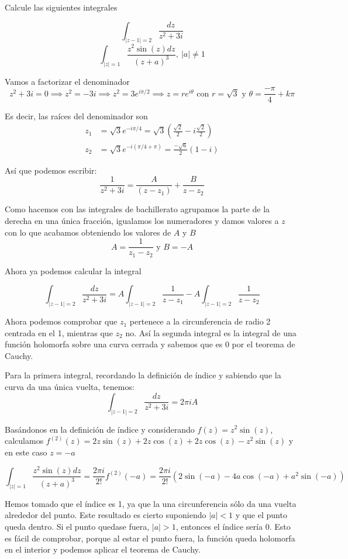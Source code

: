 \begin{problem}[10]
Calcule las siguientes integrales

\ppart
\[\int_{|z-1|=2}\frac{dz}{z^2+3i}\]
\ppart
\[\int_{|z|=1}\frac{z^2\sin(z)dz}{(z+a)^3}, \ |a|\neq 1\]
\solution

\spart

Vamos a factorizar el denominador
\[z^2+3i= 0 \implies z^2=-3i \implies z^2=3e^{iπ/2} \implies z=re^{i\theta} \text{ con } r=\sqrt{3} \text{ y } \theta = \frac{-π}{4}+kπ\]

Es decir, las raíces del denominador son
\begin{align}
z_1 &=\sqrt{3}e^{-iπ/4} = \sqrt{3}\left( \frac{\sqrt{2}}{2}-i\frac{\sqrt{2}}{2}\right)\\
z_2 &=\sqrt{3}e^{-i(π/4+π)} = \frac{-\sqrt{6}}{2}(1-i)
\end{align}

Así que podemos escribir:
\[\frac{1}{z^2+3i} = \frac{A}{(z-z_1)}+\frac{B}{z-z_2}\]

Como hacemos con las integrales de bachillerato agrupamos la parte de la derecha en una única fracción, igualamos los numeradores y damos valores  a $z$ con lo que acabamos obteniendo los valores de $A$ y $B$
\[A= \frac{1}{z_1-z_2} \text{ y } B=-A\]

Ahora ya podemos calcular la integral

\[\int_{|z-1|=2}\frac{dz}{z^2+3i} = A\int_{|z-1|=2}\frac{1}{z-z_1}-A\int_{|z-1|=2}\frac{1}{z-z_2}\]

Ahora podemos comprobar que $z_1$ pertenece a la circunferencia de radio 2 centrada en el 1, mientras que $z_2$ no. Así la segunda integral es la integral de una función holomorfa sobre una curva cerrada y sabemos que es 0 por el teorema de Cauchy.

Para la primera integral, recordando la definición de índice y sabiendo que la curva da una única vuelta, tenemos:
\[\int_{|z-1|=2}\frac{dz}{z^2+3i} = 2πiA\]

\spart

Basándonos en la definición de índice y considerando $f(z)=z^2\sin(z)$, calculamos $f^{(2)}(z) = 2z\sin(z) + 2z\cos(z) + 2z\cos(z) -z^2\sin(z)$ y en este caso $z=-a$



\[\int_{|z|=1}\frac{z^2\sin(z)dz}{(z+a)^3} = \frac{2πi}{2!}f^{(2)}(-a) = \frac{2πi}{2!}\left(2\sin(-a)-4a\cos(-a)+a^2\sin(-a)\right)\]

Hemos tomado que el índice es 1, ya que la una circunferencia sólo da una vuelta alrededor del punto. Este resultado es cierto suponiendo $|a| < 1$ y que el punto queda dentro. Si el punto quedase fuera, $|a| > 1$, entonces el índice sería 0. Esto es fácil de comprobar, porque al estar el punto fuera, la función queda holomorfa en el interior y podemos aplicar el teorema de Cauchy.

\end{problem}

